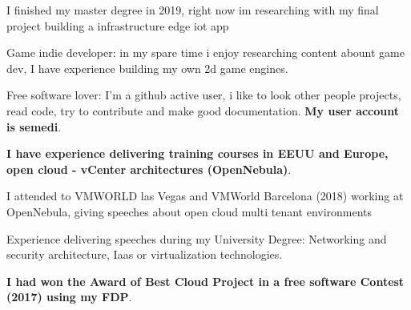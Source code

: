 

\vspace{5mm}

      \begin{cvitems} %
        \item{I finished my master degree in 2019, right now im researching with my final project building a infrastructure edge iot app}
        \item{Game indie developer: in my spare time i enjoy researching content abount game dev, I have experience building my own 2d game engines.}
        \item{Free software lover: I'm a github active user, i like to look other people projects, read code, try to contribute and make good documentation. \textbf{My user account is semedi}.}
        \item{\textbf{I have experience delivering training courses in EEUU and Europe, open cloud - vCenter architectures (OpenNebula)}.}
        \item{I attended to VMWORLD las Vegas and VMWorld Barcelona (2018) working at OpenNebula, giving speeches about open cloud multi tenant environments}
        \item{Experience delivering speeches during my University Degree: Networking and security architecture, Iaas or virtualization technologies.}
        \item{\textbf{I had won the Award of Best Cloud Project in a free software Contest (2017) using  my FDP}.}
      \end{cvitems}
